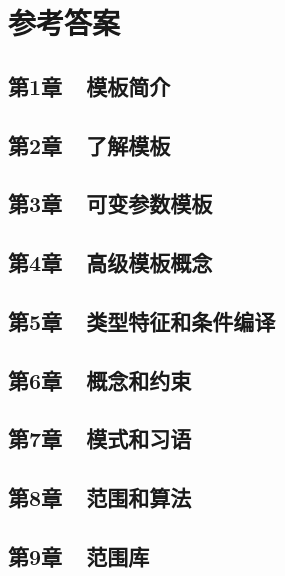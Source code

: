 \chapter{参考答案}

\section{第1章~~模板简介}


\section{第2章~~了解模板}


\section{第3章~~可变参数模板}


\section{第4章~~高级模板概念}


\section{第5章~~类型特征和条件编译}


\section{第6章~~概念和约束}


\section{第7章~~模式和习语}


\section{第8章~~范围和算法}


\section{第9章~~范围库}
